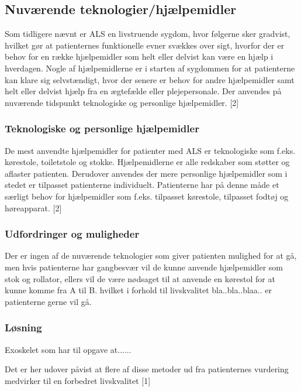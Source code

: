 \subsection{Nuværende teknologier/hjælpemidler}
Som tidligere nævnt er ALS en livstruende sygdom, hvor følgerne sker gradvist, hvilket gør at patienternes funktionelle evner svækkes over sigt, hvorfor der er behov for en række hjælpemidler som helt eller delvist kan være en hjælp i hverdagen. Nogle af hjælpemidlerne er i starten af sygdommen for at patienterne kan klare sig selvstændigt, hvor der senere er behov for andre hjælpemidler samt helt eller delvist hjælp fra en ægtefælde eller plejepersonale. Der anvendes på nuværende tidspunkt teknologiske og personlige hjælpemidler. [2]

\subsubsection{Teknologiske og personlige hjælpemidler}
De mest anvendte hjælpemidler for patienter med ALS er teknologiske som f.eks.  kørestole, toiletstole og stokke. Hjælpemidlerne er alle redskaber som støtter og aflaster patienten. Derudover anvendes der mere personlige hjælpemidler som i stedet er tilpasset patienterne individuelt. Patienterne har på denne måde et særligt behov for hjælpemidler som f.eks. tilpasset kørestole, tilpasset fodtøj og høreapparat. [2]

\subsubsection{Udfordringer og muligheder}
Der er ingen af de nuværende teknologier som giver patienten mulighed for at gå, men hvis patienterne har gangbesvær vil de kunne anvende hjælpemidler som stok og rollator, ellers vil de være nødsaget til at anvende en kørestol for at kunne komme fra A til B. hvilket i forhold til livskvalitet bla..bla..blaa.. er patienterne gerne vil gå.


\subsubsection{Løsning}
Exoskelet som har til opgave at......




Det er her udover påvist at flere af disse metoder ud fra patienternes vurdering medvirker til en forbedret livskvalitet [1]

